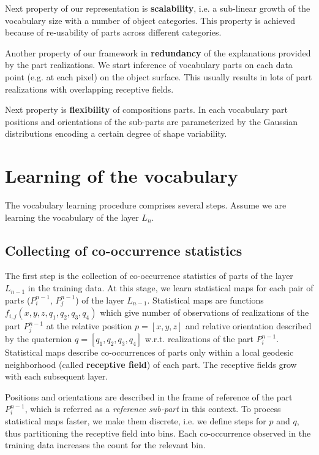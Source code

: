 \documentclass[conference]{IEEEtran}
\begin{document}
{Next property of our representation is \textbf{scalability}, i.e. a
sub-linear growth of the vocabulary size with a number of object
categories. This property is achieved because of re-usability of
parts across different categories.

Another property of our framework in \textbf{redundancy} of the
explanations provided by the part realizations. We start inference
of vocabulary parts on each data point (e.g. at each pixel) on the
object surface. This usually results in lots of part realizations
with overlapping receptive fields.

Next property is \textbf{flexibility} of compositions parts. In each
vocabulary part positions and orientations of the sub-parts are
parameterized by the Gaussian distributions encoding a certain
degree of shape variability.


\section{Learning of the vocabulary\label{sec:Learning}}

The vocabulary learning procedure comprises several steps. Assume we
are learning the vocabulary of the layer $L_n$.

\subsection{Collecting of co-occurrence statistics\label{sec:Collection}}
    The first step is the collection of co-occurrence statistics of parts of the layer $L_{n-1}$ in the training data. At
    this stage, we learn statistical maps for each pair of parts ($P_i^{n-1}$, $P_j^{n-1}$) of the layer
    $L_{n-1}$. Statistical maps are functions $f_{i,j}(x,y,z,q_1,q_2,q_3,q_4)$ which give number of observations of realizations of the part
    $P_j^{n-1}$ at the relative position $p = [x,y,z]$ and relative orientation described
    by the quaternion $q = [q_1,q_2,q_3,q_4]$ w.r.t. realizations of the part
    $P_i^{n-1}$. Statistical maps describe co-occurrences of parts only within a local geodesic neighborhood (called \textbf{receptive
    field}) of each part. The receptive fields grow with each subsequent
    layer.

    Positions and orientations are described in the frame of reference
    of the part $P_i^{n-1}$, which is referred as a \emph{reference sub-part}
    in this context. To process statistical maps faster, we make them discrete, i.e. we define steps
    for $p$ and $q$, thus partitioning the receptive field into
    bins. Each co-occurrence observed in the training
    data increases the count for the relevant bin.

}
\end{document}
